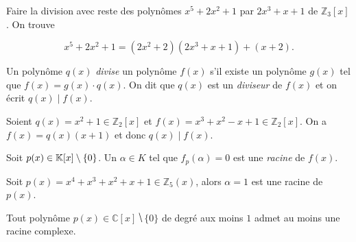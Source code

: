 

\begin{example}
  \label{exe:24}
  Faire la division avec reste des polynômes  $x^5+2x^2+1$ par $2x^3+x+1$ de $ℤ_3[x]$. On trouve

  \begin{displaymath}
    x^5+2x^2+1 = (2x^2 +2) (2x^3 + x +1) + (x+2). 
  \end{displaymath}
  
\end{example}






\begin{definition}
  \label{def:32}
  Un polynôme  $q(x)$ \emph{divise} un  polynôme $f(x)$ s'il existe un polynôme $g(x)$ tel que $f(x) = g(x) \cdot q(x)$. On dit que $q(x)$ est un \emph{diviseur} de $f(x)$ et on écrit $q(x) \mid f(x)$. 
\end{definition}


\begin{example}
  \label{exe:41}
  Soient $q(x) = x^2 +1 ∈ℤ_2[x]$ et $ f(x) = x^3 + x^2 - x+1 ∈ ℤ_2[x]$. On a
  $f(x) = q(x) (x+1)$ et donc 
   $q(x) \mid f(x)$. 
\end{example}


\begin{definition}
  \label{def:31}
  Soit $p(x) \in \mathbb{K}[x] \setminus\{0\}$. Un $\alpha \in K$ tel que $f_p(\alpha) = 0$ est une  \emph{ racine} de $f(x)$.  
\end{definition}


\begin{example}
  \label{exe:40}
  Soit $p(x) = x^4 + x^3 + x^2 + x + 1 ∈ ℤ_5(x)$, alors $α = 1$ est une racine de $p(x)$. 
\end{example}


\begin{theorem}
  \label{thr:44}
  Tout polynôme $p(x) ∈ℂ[x] ⧹\{0\}$ de degré aux moins $1$  admet au moins une racine complexe.
\end{theorem}




